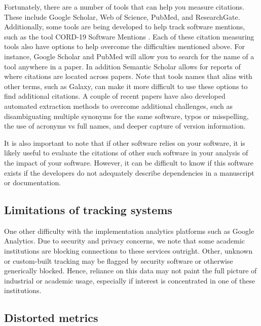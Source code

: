 \documentclass{article}
\begin{document}
Fortunately, there are a number of tools that can help you measure citations. These include Google Scholar, Web of Science, PubMed, and ResearchGate. Additionally, some tools are being developed to help track software mentions, such as the tool CORD-19 Software Mentions \cite{wade_cord-19_2021}. Each of these citation measuring tools also have options to help overcome the difficulties mentioned above. For instance, Google Scholar and PubMed will allow you to search for the name of a tool anywhere in a paper. In addition Semantic Scholar allows for reports of where citations are located across papers. Note that tools names that alias with other terms, such as Galaxy, can make it more difficult to use these options to find additional citations. A couple of recent papers \cite{istrate_large_2022, schindler_role_2022} have also developed automated extraction methods to overcome additional challenges, such as disambiguating multiple synonyms for the same software, typos or misspelling, the use of acronyms vs full names, and deeper capture of version information. 

It is also important to note that if other software relies on your software, it is likely useful to evaluate the citations of other such software in your analysis of the impact of your software. However, it can be difficult to know if this software exists if the developers do not adequately describe dependencies in a manuscript or documentation.

\subsection{Limitations of tracking systems}
One other difficulty with the implementation analytics platforms such as Google Analytics. Due to security and privacy concerns, we note that some academic institutions are blocking connections to these services outright. Other, unknown or custom-built tracking may be flagged by security software or otherwise generically blocked. Hence, reliance on this data may not paint the full picture of industrial or academic usage, especially if interest is concentrated in one of these institutions.

\subsection{Distorted metrics}
\end{document}
